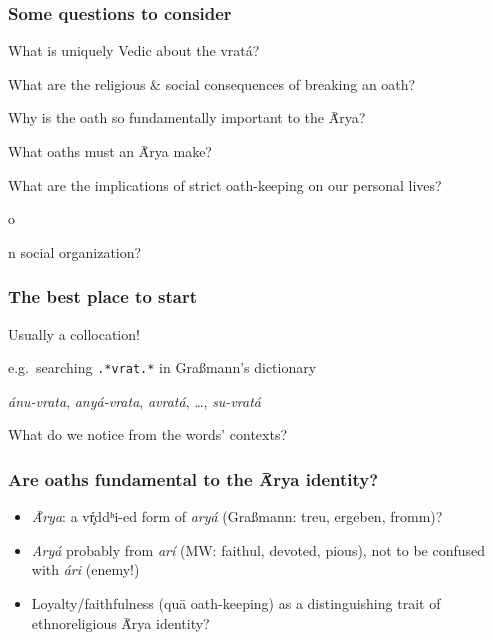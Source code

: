 \documentclass[pdf]{beamer}
\newcommand{\Subitem}[1]{{\setlength\itemindent{12pt} \item[-] #1}}
\begin{document}
\begin{frame} \frametitle{Some questions to consider}
\begin{itemize}
	\item What is uniquely Vedic about the vratá?
	\item What are the religious \& social consequences of breaking an oath?
	\item Why is the oath so fundamentally important to the Ā́rya?
	\item What oaths must an Ā́rya make?
	\item What are the implications of strict oath-keeping on our personal lives?
	\Subitem on social organization?
\end{itemize}
\end{frame}

\begin{frame} \frametitle{The best place to start}
\begin{itemize}
	\item Usually a collocation!
	\item e.g.~searching \texttt{.*vrat.*} in Graßmann's dictionary
	\Subitem {\textit{ánu-vrata}, \textit{anyá-vrata}, \textit{avratá}, \ldots, \textit{su-vratá}}
	\item What do we notice from the words' contexts?
\end{itemize}
\end{frame}

\begin{frame} \frametitle{Are oaths fundamental to the Ā́rya identity?}
\begin{itemize}
	\item \textit{Ā́rya}: a vŕ̥ddʰi-ed form of \textit{aryá} (Graßmann: treu, ergeben, fromm)?
	\pause \item \textit{Aryá} probably from \textit{arí} (MW: faithul, devoted, pious), not to be confused with \textit{ári} (enemy!)
	\pause \item Loyalty/faithfulness (quā oath-keeping) as a distinguishing trait of ethnoreligious Ā́rya identity?
\end{itemize}
\end{frame}
\end{document}
